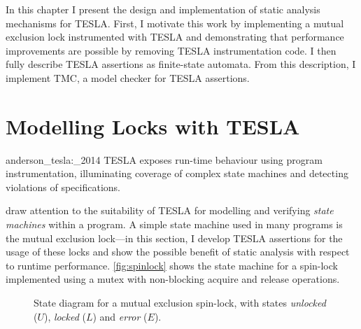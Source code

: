 In this chapter I present the design and implementation of static analysis
mechanisms for TESLA. First, I motivate this work by implementing a mutual
exclusion lock instrumented with TESLA and demonstrating that performance
improvements are possible by removing TESLA instrumentation code. I then
fully describe TESLA assertions as finite-state automata. From this description,
I implement TMC, a model checker for TESLA assertions.

\section{Modelling Locks with TESLA} \label{sec:locks}

\begin{displaycquote}[p.\ 1]{anderson_tesla:_2014}
TESLA exposes run-time behaviour using program instrumentation, illuminating
coverage of complex state machines and detecting violations of specifications.
\end{displaycquote}

\textcite{anderson_tesla:_2014} draw attention to the suitability of TESLA for
modelling and verifying \emph{state machines} within a program. A simple state
machine used in many programs is the mutual exclusion lock---in this section, I
develop TESLA assertions for the usage of these locks and show the possible
benefit of static analysis with respect to runtime performance.
\autoref{fig:spinlock} shows the state machine for a spin-lock implemented using
a mutex with non-blocking acquire and release operations.

\begin{figure}
  \centering
  \caption{State diagram for a mutual exclusion spin-lock, with states
  \emph{unlocked} ($U$), \emph{locked} ($L$) and \emph{error} ($E$).}
  \label{fig:spinlock}
\end{figure}

